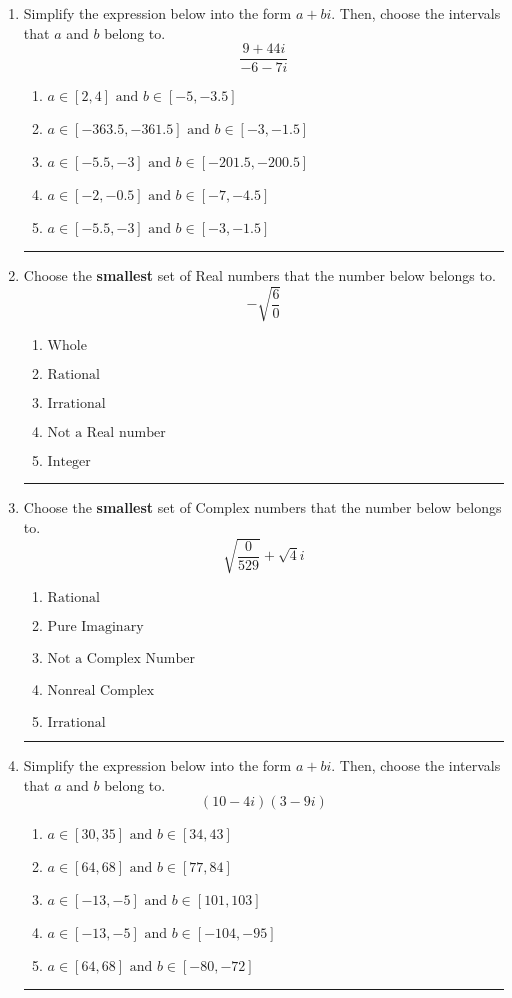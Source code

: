 \documentclass[14pt]{extbook}
\newcommand{\litem}[1]{\item#1\hspace*{-1cm}\rule{\textwidth}{0.4pt}}
\begin{document}
\begin{enumerate}
\litem{
Simplify the expression below into the form $a+bi$. Then, choose the intervals that $a$ and $b$ belong to.\[ \frac{9 + 44 i}{-6 - 7 i} \]\begin{enumerate}[label=\Alph*.]
\item \( a \in [2, 4] \text{ and } b \in [-5, -3.5] \)
\item \( a \in [-363.5, -361.5] \text{ and } b \in [-3, -1.5] \)
\item \( a \in [-5.5, -3] \text{ and } b \in [-201.5, -200.5] \)
\item \( a \in [-2, -0.5] \text{ and } b \in [-7, -4.5] \)
\item \( a \in [-5.5, -3] \text{ and } b \in [-3, -1.5] \)

\end{enumerate} }
\litem{
Choose the \textbf{smallest} set of Real numbers that the number below belongs to.\[ -\sqrt{\frac{6}{0}} \]\begin{enumerate}[label=\Alph*.]
\item \( \text{Whole} \)
\item \( \text{Rational} \)
\item \( \text{Irrational} \)
\item \( \text{Not a Real number} \)
\item \( \text{Integer} \)

\end{enumerate} }
\litem{
Choose the \textbf{smallest} set of Complex numbers that the number below belongs to.\[ \sqrt{\frac{0}{529}}+\sqrt{4}i \]\begin{enumerate}[label=\Alph*.]
\item \( \text{Rational} \)
\item \( \text{Pure Imaginary} \)
\item \( \text{Not a Complex Number} \)
\item \( \text{Nonreal Complex} \)
\item \( \text{Irrational} \)

\end{enumerate} }
\litem{
Simplify the expression below into the form $a+bi$. Then, choose the intervals that $a$ and $b$ belong to.\[ (10 - 4 i)(3 - 9 i) \]\begin{enumerate}[label=\Alph*.]
\item \( a \in [30, 35] \text{ and } b \in [34, 43] \)
\item \( a \in [64, 68] \text{ and } b \in [77, 84] \)
\item \( a \in [-13, -5] \text{ and } b \in [101, 103] \)
\item \( a \in [-13, -5] \text{ and } b \in [-104, -95] \)
\item \( a \in [64, 68] \text{ and } b \in [-80, -72] \)


\end{enumerate}}
\end{enumerate}
\end{document}
